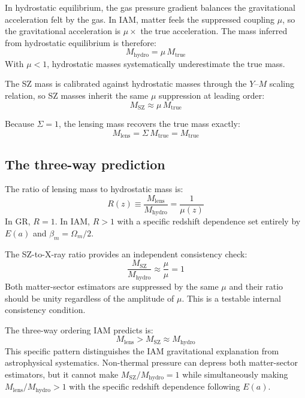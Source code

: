 \documentclass[12pt,a4paper]{article}
\begin{document}
In hydrostatic equilibrium, the gas pressure gradient balances the gravitational
acceleration felt by the gas. In IAM, matter feels the suppressed coupling $\mu$,
so the gravitational acceleration is $\mu \times$ the true acceleration. The mass
inferred from hydrostatic equilibrium is therefore:
\begin{equation}
M_\mathrm{hydro} = \mu\, M_\mathrm{true}
\end{equation}
With $\mu < 1$, hydrostatic masses systematically underestimate the true mass.

The SZ mass is calibrated against hydrostatic masses through the $Y$--$M$ scaling
relation, so SZ masses inherit the same $\mu$ suppression at leading order:
\begin{equation}
M_\mathrm{SZ} \approx \mu\, M_\mathrm{true}
\end{equation}

Because $\Sigma = 1$, the lensing mass recovers the true mass exactly:
\begin{equation}
M_\mathrm{lens} = \Sigma\, M_\mathrm{true} = M_\mathrm{true}
\end{equation}

\subsection{The three-way prediction}

The ratio of lensing mass to hydrostatic mass is:
\begin{equation}
R(z) \equiv \frac{M_\mathrm{lens}}{M_\mathrm{hydro}} = \frac{1}{\mu(z)}
\label{eq:ratio}
\end{equation}
In GR, $R = 1$. In IAM, $R > 1$ with a specific redshift dependence set entirely
by $E(a)$ and $\beta_m = \Omega_m/2$.

The SZ-to-X-ray ratio provides an independent consistency check:
\begin{equation}
\frac{M_\mathrm{SZ}}{M_\mathrm{hydro}} \approx \frac{\mu}{\mu} = 1
\end{equation}
Both matter-sector estimators are suppressed by the same $\mu$ and their ratio
should be unity regardless of the amplitude of $\mu$. This is a testable internal
consistency condition.

The three-way ordering IAM predicts is:
\begin{equation}
M_\mathrm{lens} > M_\mathrm{SZ} \approx M_\mathrm{hydro}
\label{eq:ordering}
\end{equation}
This specific pattern distinguishes the IAM gravitational explanation from
astrophysical systematics. Non-thermal pressure can depress both matter-sector
estimators, but it cannot make $M_\mathrm{SZ}/M_\mathrm{hydro} = 1$ while
simultaneously making $M_\mathrm{lens}/M_\mathrm{hydro} > 1$ with the specific
redshift dependence following $E(a)$.
\end{document}
